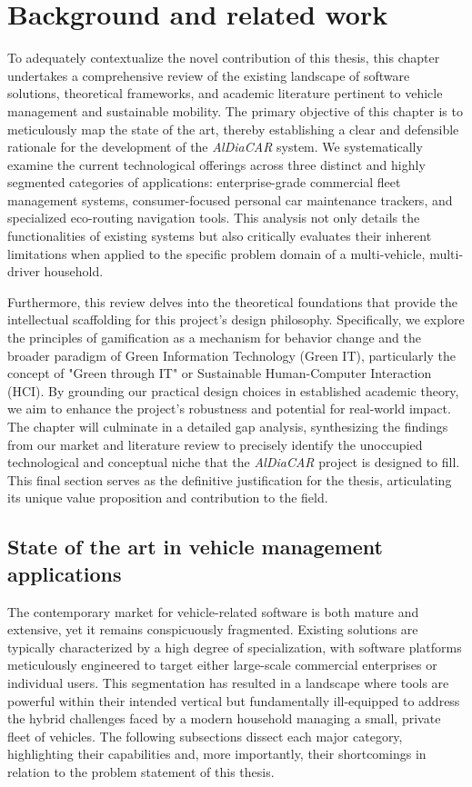 \chapter{Background and related work}

To adequately contextualize the novel contribution of this thesis, this chapter undertakes a comprehensive review of the existing landscape of software solutions, theoretical frameworks, and academic literature pertinent to vehicle management and sustainable mobility. The primary objective of this chapter is to meticulously map the state of the art, thereby establishing a clear and defensible rationale for the development of the \textit{AlDiaCAR} system. We systematically examine the current technological offerings across three distinct and highly segmented categories of applications: enterprise-grade commercial fleet management systems, consumer-focused personal car maintenance trackers, and specialized eco-routing navigation tools. This analysis not only details the functionalities of existing systems but also critically evaluates their inherent limitations when applied to the specific problem domain of a multi-vehicle, multi-driver household.

\textgap

Furthermore, this review delves into the theoretical foundations that provide the intellectual scaffolding for this project's design philosophy. Specifically, we explore the principles of gamification as a mechanism for behavior change and the broader paradigm of Green Information Technology (Green IT), particularly the concept of "Green through IT" or Sustainable Human-Computer Interaction (HCI). By grounding our practical design choices in established academic theory, we aim to enhance the project's robustness and potential for real-world impact. The chapter will culminate in a detailed gap analysis, synthesizing the findings from our market and literature review to precisely identify the unoccupied technological and conceptual niche that the \textit{AlDiaCAR} project is designed to fill. This final section serves as the definitive justification for the thesis, articulating its unique value proposition and contribution to the field.

\section{State of the art in vehicle management applications}

The contemporary market for vehicle-related software is both mature and extensive, yet it remains conspicuously fragmented. Existing solutions are typically characterized by a high degree of specialization, with software platforms meticulously engineered to target either large-scale commercial enterprises or individual users. This segmentation has resulted in a landscape where tools are powerful within their intended vertical but fundamentally ill-equipped to address the hybrid challenges faced by a modern household managing a small, private fleet of vehicles. The following subsections dissect each major category, highlighting their capabilities and, more importantly, their shortcomings in relation to the problem statement of this thesis.

